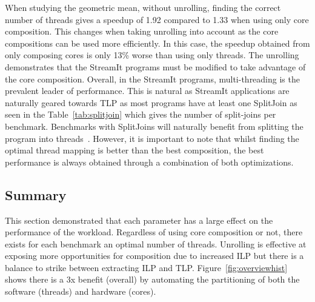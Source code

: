 When studying the geometric mean, without unrolling, finding the correct number of threads gives a speedup of 1.92 compared to 1.33 when using only core composition.
This changes when taking unrolling into account as the core compositions can be used more efficiently.
In this case, the speedup obtained from only composing cores is only 13\% worse than using only threads. 
The unrolling demonstrates that the StreamIt programs must be modified to take advantage of the core composition.
Overall, in the StreamIt programs, multi-threading is the prevalent leader of performance.
This is natural as StreamIt applications are naturally geared towards TLP as most programs have at least one SplitJoin as seen in the Table~\ref{tab:splitjoin} which gives the number of split-joins per benchmark.
Benchmarks with SplitJoins will naturally benefit from splitting the program into threads~\cite{thiesStreamit2010}.
However, it is important to note that whilst finding the optimal thread mapping is better than the best composition, the best performance is always obtained through a combination of both optimizations. 

\subsection{Summary}

This section demonstrated that each parameter has a large effect on the performance of the workload.
Regardless of using core composition or not, there exists for each benchmark an optimal number of threads.
Unrolling is effective at exposing more opportunities for composition due to increased ILP but there is a balance to strike between extracting ILP and TLP.
Figure~\ref{fig:overviewhist} shows there is a 3x benefit (overall) by automating the partitioning of both the software (threads) and hardware (cores).

